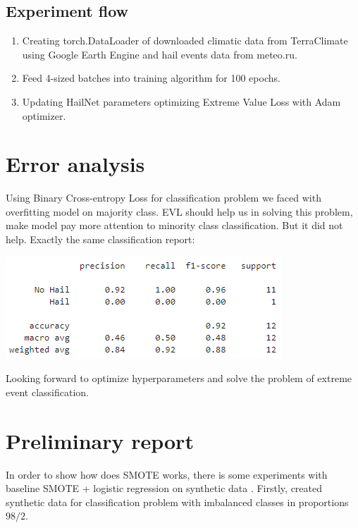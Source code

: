 \documentclass{article}
\begin{document}
\subsection{Experiment flow}
\begin{enumerate}
    \item  Creating torch.DataLoader of downloaded climatic data from TerraClimate using Google Earth Engine and hail events data from meteo.ru.
    \item Feed 4-sized batches into training algorithm for 100 epochs.
    \item Updating HailNet parameters optimizing Extreme Value Loss with Adam optimizer.
\end{enumerate}

\section{Error analysis}
Using Binary Cross-entropy Loss for classification problem we faced with overfitting model on majority class. EVL should help us in solving this problem, make model pay more attention to minority class classification. But it did not help. Exactly the same classification report:

\includegraphics[scale = 1]{figures/class_report.png}

Looking forward to optimize hyperparameters and solve the problem of extreme event classification.
\section{Preliminary report}
In order to show how does SMOTE works, there is some experiments with baseline SMOTE + logistic regression on synthetic data . Firstly, created synthetic data for classification problem with imbalanced classes in proportions $98/2$.
\end{document}
